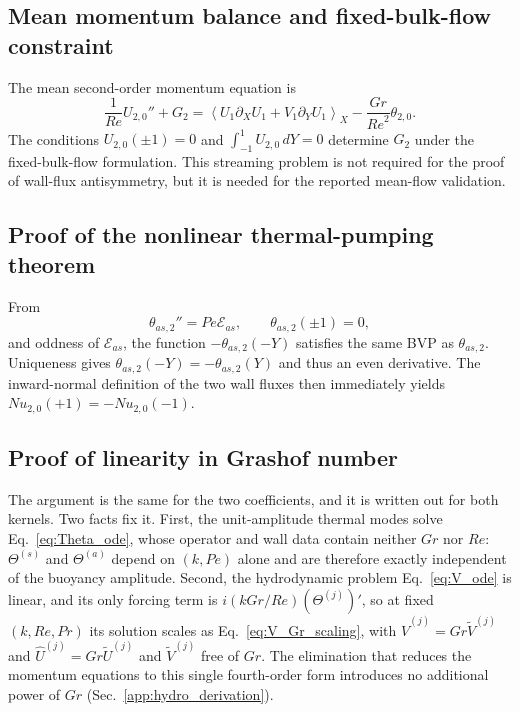 \documentclass[12pt,a4paper]{article}
\newcommand{\Rey}{\mathit{Re}}
\newcommand{\Pe}{\mathit{Pe}}
\newcommand{\Grr}{\mathit{Gr}}
\newcommand{\Nu}{\mathit{Nu}}
\renewcommand{\Pr}{\mathit{Pr}}
\begin{document}
\subsection{Mean momentum balance and fixed-bulk-flow constraint}
\label{app:mean_momentum}

The mean second-order momentum equation is
\begin{equation}
  \frac{1}{\Rey}U_{2,0}''+G_2
  =\left\langle U_1\partial_XU_1+V_1\partial_YU_1\right\rangle_X
  -\frac{\Grr}{\Rey^2}\theta_{2,0}.
\end{equation}
The conditions $U_{2,0}(\pm1)=0$ and $\int_{-1}^{1}U_{2,0}\,dY=0$ determine $G_2$ under the fixed-bulk-flow formulation.
This streaming problem is not required for the proof of wall-flux antisymmetry, but it is needed for the reported
mean-flow validation.

\subsection{Proof of the nonlinear thermal-pumping theorem}
\label{app:theorem_proof}

From
\begin{equation}
  \theta_{as,2}''=\Pe\mathcal E_{as},\qquad \theta_{as,2}(\pm1)=0,
\end{equation}
and oddness of $\mathcal E_{as}$, the function $-\theta_{as,2}(-Y)$ satisfies the same BVP as
$\theta_{as,2}$. Uniqueness gives $\theta_{as,2}(-Y)=-\theta_{as,2}(Y)$ and thus an even derivative.
The inward-normal definition of the two wall fluxes then immediately yields
$\Nu_{2,0}(+1)=-\Nu_{2,0}(-1)$.

\subsection{Proof of linearity in Grashof number}
\label{app:prop_proof}

The argument is the same for the two coefficients, and it is written out for both kernels.
Two facts fix it. First, the unit-amplitude thermal modes solve Eq.~\eqref{eq:Theta_ode},
whose operator and wall data contain neither $\Grr$ nor $\Rey$: $\Theta^{(s)}$ and
$\Theta^{(a)}$ depend on $(k,\Pe)$ alone and are therefore exactly independent of the
buoyancy amplitude. Second, the hydrodynamic problem Eq.~\eqref{eq:V_ode} is linear, and its
only forcing term is $i(k\Grr/\Rey)(\Theta^{(j)})'$, so at fixed $(k,\Rey,\Pr)$ its solution
scales as Eq.~\eqref{eq:V_Gr_scaling}, with
$\widehat V^{(j)}=\Grr\widetilde V^{(j)}$ and $\widehat U^{(j)}=\Grr\widetilde U^{(j)}$ and
$\widetilde V^{(j)}$ free of $\Grr$. The elimination that reduces the momentum equations to
this single fourth-order form introduces no additional power of $\Grr$
(Sec.~\ref{app:hydro_derivation}).
\end{document}
